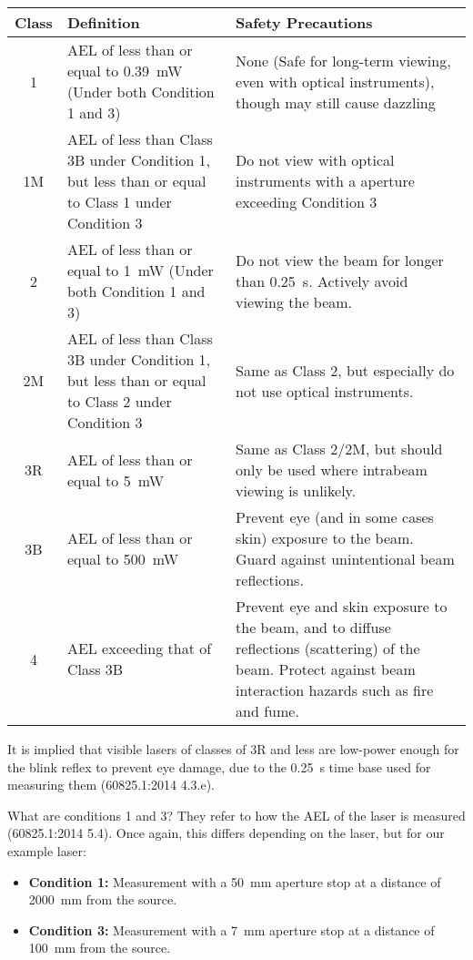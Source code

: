 \documentclass[a4paper]{scrartcl}
\begin{document}
\begin{center}
    \begin{tabular}{c | p{9cm} | p{7cm}}
        Class & Definition & Safety Precautions \\
        \hline
        1 & AEL of less than or equal to \SI{0.39}{\milli\watt} (Under both Condition 1 and 3) & None (Safe for long-term viewing, even with optical instruments), though may still cause dazzling \\
        1M & AEL of less than Class 3B under Condition 1, but less than or equal to Class 1 under Condition 3 & Do not view with optical instruments with a aperture exceeding Condition 3 \\
        2 & AEL of less than or equal to \SI{1}{\milli\watt} (Under both Condition 1 and 3) & Do not view the beam for longer than \SI{0.25}{\second}. Actively avoid viewing the beam. \\
        2M & AEL of less than Class 3B under Condition 1, but less than or equal to Class 2 under Condition 3 & Same as Class 2, but especially do not use optical instruments. \\
        3R & AEL of less than or equal to \SI{5}{\milli\watt} & Same as Class 2/2M, but should only be used where intrabeam viewing is unlikely. \\
        3B & AEL of less than or equal to \SI{500}{\milli\watt} & Prevent eye (and in some cases skin) exposure to the beam. Guard against unintentional beam reflections.\\
        4 & AEL exceeding that of Class 3B & Prevent eye and skin exposure to the beam, and to diffuse reflections (scattering) of the beam. Protect against beam interaction hazards such as fire and fume.
    \end{tabular}
\end{center}

It is implied that visible lasers of classes of 3R and less are low-power enough for the blink reflex to prevent eye damage, due to the \SI{0.25}{\second} time base used for measuring them (60825.1:2014 4.3.e).

What are conditions 1 and 3? They refer to how the AEL of the laser is measured (60825.1:2014 5.4). Once again, this differs depending on the laser, but for our example laser:
\begin{itemize}
    \item \textbf{Condition 1:} Measurement with a \SI{50}{\milli\metre} aperture stop at a distance of \SI{2000}{\milli\metre} from the source.
    \item \textbf{Condition 3:} Measurement with a \SI{7}{\milli\metre} aperture stop at a distance of \SI{100}{\milli\metre} from the source.
\end{itemize}
\end{document}
